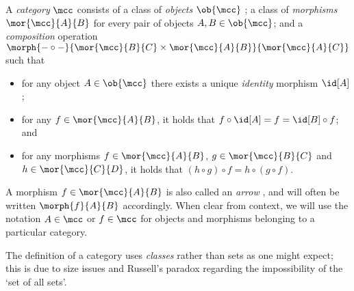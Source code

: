 \begin{definition}[Category]
    \label{def:category}
    A \emph{category} \(\mcc\)
    consists of a class of \emph{objects}
    \(\ob{\mcc}\)
    ;
    a class of \emph{morphisms} \(\mor{\mcc}{A}{B}\)
    for every pair of objects \(A, B \in \ob{\mcc}\); and a \emph{composition}
    operation \(
    \morph{
        {-} \circ {-}
    }{
        \mor{\mcc}{B}{C} \times \mor{\mcc}{A}{B}
    }{
        \mor{\mcc}{A}{C}
    }
    \)
     such that
    \begin{itemize}
        \item
              for any object \(A \in \ob{\mcc}\) there exists a unique
              \emph{identity} morphism \(\id[A]\);
        \item
              for any \(f \in \mor{\mcc}{A}{B}\), it holds that \(
              f \circ \id[A] = f = \id[B] \circ f
              \); and
        \item for any morphisms \(
              f \in \mor{\mcc}{A}{B}
              \), \(
              g \in \mor{\mcc}{B}{C}
              \) and \(h \in \mor{\mcc}{C}{D}\), it holds that \(
              (h \circ g) \circ f = h \circ (g \circ f).
              \)
    \end{itemize}
\end{definition}

A morphism \(f \in \mor{\mcc}{A}{B}\) is also called an \emph{arrow}
, and will
often be written \(\morph{f}{A}{B}\) accordingly.
When clear from context, we will use the notation \(A \in \mcc\) or
\(f \in \mcc\) for objects and morphisms belonging to a particular category.

\begin{remark}
    The definition of a category uses \emph{classes} rather than sets as one
    might expect; this is due to size issues and Russell's paradox regarding
    the impossibility of the `set of all sets'.
\end{remark}

